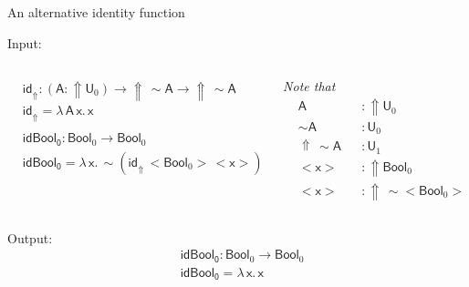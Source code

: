 \documentclass[dvipsnames,aspectratio=169]{beamer}
\newcommand{\msf}[1]{\mathsf{#1}}
\newcommand{\Lift}{{\Uparrow}}
\newcommand{\spl}{{\sim}}
\newcommand{\qut}[1]{{<}#1{>}}
\newcommand{\U}{\msf{U}}
\newcommand{\Bool}{\msf{Bool}}
\newcommand{\id}{\msf{id}}
\theoremstyle{remark}
\newcommand{\msA}{\msf{A}}
\newcommand{\msx}{\msf{x}}
\begin{document}
\begin{frame}{An alternative identity function}


Input:
\begin{columns}
\begin{column}{0.5\textwidth}
\begin{alignat*}{4}
  & \id_\Lift : (\msA : \Lift\U_0) \to \Lift\,\spl{\msA} \to \Lift\,\spl{\msA}\\
  & \id_\Lift = \lambda\,\msA\,\msx.\,\msx     \\
  & \\
  & \msf{idBool_0} : \Bool_0 \to \Bool_0\\
  & \msf{idBool_0} = \lambda\,\msx.\,\spl(\id_\Lift\,\qut{\Bool_0}\,\qut{\msx})
\end{alignat*}
\end{column}
\pause
\begin{column}{0.5\textwidth}
\emph{Note that}
\vspace{-1em}
\begin{alignat*}{4}
  & \msA &&: \Lift\U_0 \\
  & \spl\msA &&: \U_0 \\
  & \Lift\,\spl\msA &&: \U_1\\
  & \qut{\msx} &&: \Lift\Bool_0\\
  & \qut{\msx} &&: \Lift\,\spl\qut{\Bool_0}
\end{alignat*}

\end{column}
\end{columns}
\vspace{1em}
\pause
Output:
\begin{alignat*}{4}
  & \msf{idBool_0} : \Bool_0 \to \Bool_0\\
  & \msf{idBool_0} = \lambda\,\msx.\,\msx
\end{alignat*}


\end{frame}
\end{document}
